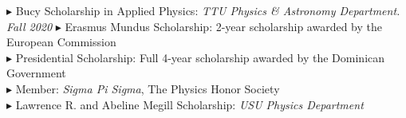 \documentclass[letterpaper,10pt]{article}
\begin{document}
\hspace{.2 cm}   $\blacktriangleright$ Bucy Scholarship in Applied Physics: \emph{TTU Physics \& Astronomy Department. Fall 2020}   %
 \hspace{.3 cm}  $\blacktriangleright$  Erasmus Mundus Scholarship: 2-year scholarship awarded by the European Commission  \\    
 \hspace{.2 cm}    $\blacktriangleright$  Presidential Scholarship: Full 4-year scholarship awarded by the Dominican Government \\    
\hspace{.2 cm}   $\blacktriangleright$  Member: \emph{Sigma Pi Sigma}, The Physics Honor Society  \\   
\hspace{.2 cm}   $\blacktriangleright$   Lawrence  R. and Abeline Megill Scholarship: \emph{USU Physics Department}   %



\end{document}
